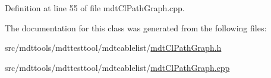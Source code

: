 Definition at line 55 of file mdt\-Cl\-Path\-Graph.\-cpp.



The documentation for this class was generated from the following files\-:\begin{DoxyCompactItemize}
\item 
src/mdttools/mdttesttool/mdtcablelist/\hyperlink{mdt_cl_path_graph_8h}{mdt\-Cl\-Path\-Graph.\-h}\item 
src/mdttools/mdttesttool/mdtcablelist/\hyperlink{mdt_cl_path_graph_8cpp}{mdt\-Cl\-Path\-Graph.\-cpp}\end{DoxyCompactItemize}
